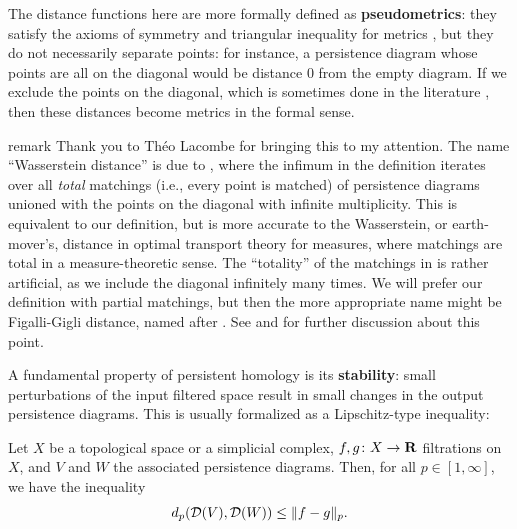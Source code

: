\begin{remark}
  The distance functions here are more formally defined as \textbf{pseudometrics}: they satisfy the axioms of symmetry and triangular inequality for metrics \cite{EdelsbrunnerHarer2010}, but they do not necessarily separate points: for instance, a persistence diagram whose points are all on the diagonal would be distance $0$ from the empty diagram. If we exclude the points on the diagonal, which is sometimes done in the literature \cite{CCBdS2016}, then these distances become metrics in the formal sense.
\end{remark}

\begin{footnoted}{remark}
{Thank you to Théo Lacombe for bringing this to my attention.}
  The name ``Wasserstein distance'' is due to \cite{EdelsbrunnerHarer2010}, where the infimum in the definition iterates over all \emph{total} matchings (i.e., every point is matched) of persistence diagrams unioned with the points on the diagonal with infinite multiplicity. This is equivalent to our definition, but is more accurate to the Wasserstein, or earth-mover's, distance in optimal transport theory for measures, where matchings are total in a measure-theoretic sense. The ``totality'' of the matchings in \cite{EdelsbrunnerHarer2010} is rather artificial, as we include the diagonal infinitely many times. We will prefer our definition with partial matchings, but then the more appropriate name might be Figalli-Gigli distance, named after \cite{FigalliGigli2010}. See \cite{DivolLacombe2021} and \cite[Remark 2]{JanthialLacombe2026} for further discussion about this point.
\end{footnoted}

A fundamental property of persistent homology is its \textbf{stability}: small perturbations of the input filtered space result in small changes in the output persistence diagrams. This is usually formalized as a Lipschitz-type inequality:

\begin{theorem}
  Let $X$ be a topological space or a simplicial complex, $f, g \colon X \to \mathbf{R}$ filtrations on $X$, and $V$ and $W$ the associated persistence diagrams. Then, for all $p \in [1, \infty]$, we have the inequality
  \[
    d_p(\mathcal{D}(V), \mathcal{D}(W)) \leq \| f - g \|_p.
  \]
\end{theorem}

